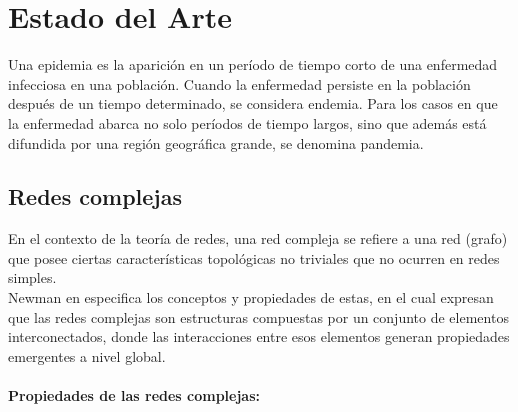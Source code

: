 \chapter{Estado del Arte}\label{chapter:state-of-the-art}
Una epidemia es la aparición en un período de tiempo corto de una enfermedad infecciosa en
una población. Cuando la enfermedad persiste en la población después de un tiempo determinado, 
se considera endemia. Para los casos en que la enfermedad abarca no solo períodos de
tiempo largos, sino que además está difundida por una región geográfica grande, se denomina
pandemia.\autocite{Morens2004}
\section{Redes complejas}
En el contexto de la teoría de redes, una red compleja se refiere a una red (grafo) que posee
ciertas características topológicas no triviales que no ocurren en redes simples.\\
Newman en \autocite{Newman2003} especifica los conceptos y propiedades de estas,
en el cual expresan que las redes complejas son estructuras compuestas por un conjunto de elementos interconectados, 
donde las interacciones entre esos elementos generan propiedades emergentes a nivel global.\\ 
\\
\textbf{Propiedades de las redes complejas:} 
